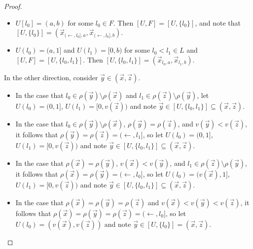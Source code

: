 \documentclass[11pt]{article}
\newcommand{\vect}{\vec}
\begin{document}
\begin{proof}
    \begin{itemize}
      \item
        \(U[l_0]=(a,b)\) for some \(l_0\in F\).
        Then \([U,F]=[U,\{l_0\}]\), and note that
        \(
          [U,\{l_0\}]
            =
          (\vect x_{(\leftarrow,l_0],a},\vect x_{(\leftarrow,l_0],b})
        \).
      \item
        \(U(l_0)=(a,1]\) and \(U(l_1)=[0,b)\) for some \(l_0<l_1\in L\)
        and \([U,F]=[U,\{l_0,l_1\}]\). Then
        \([U,\{l_0,l_1\}]=(\vect x_{l_0,a},\vect x_{l_1,b})\).
    \end{itemize}
    In the other direction, consider \(\vect y\in(\vect x,\vect z)\).
    \begin{itemize}
      \item
        In the case that \(l_0\in\rho(\vect y)\setminus\rho(\vect x)\)
        and \(l_1\in\rho(\vect z)\setminus\rho(\vect y)\), let
        \(U(l_0)=(0,1]\), \(U(l_1)=[0,v(\vect z))\) and note
        \(\vect y\in[U,\{l_0,l_1\}]\subseteq(\vect x,\vect z)\).
      \item
        In the case that \(l_0\in\rho(\vect y)\setminus\rho(\vect x)\),
        \(\rho(\vect y)=\rho(\vect z)\), and \(v(\vect y)<v(\vect z)\),
        it follows that \(\rho(\vect y)=\rho(\vect z)=(\leftarrow,l_1]\),
        so let \(U(l_0)=(0,1]\), \(U(l_1)=[0,v(\vect z))\) and note
        \(\vect y\in[U,\{l_0,l_1\}]\subseteq(\vect x,\vect z)\).
      \item
        In the case that
        \(\rho(\vect x)=\rho(\vect y)\), \(v(\vect x)<v(\vect y)\),
        and \(l_1\in\rho(\vect z)\setminus\rho(\vect y)\),
        it follows that \(\rho(\vect x)=\rho(\vect y)=(\leftarrow,l_0]\),
        so let \(U(l_0)=(v(\vect x),1]\), \(U(l_1)=[0,v(\vect z))\) and note
        \(\vect y\in[U,\{l_0,l_1\}]\subseteq(\vect x,\vect z)\).
      \item
        In the case that
        \(\rho(\vect x)=\rho(\vect y)=\rho(\vect z)\) and
        \(v(\vect x)<v(\vect y)<v(\vect z)\),
        it follows that
        \(\rho(\vect x)=\rho(\vect y)=\rho(\vect z)=(\leftarrow,l_0]\),
        so let \(U(l_0)=(v(\vect x),v(\vect z))\) and note
        \(\vect y\in[U,\{l_0\}]=(\vect x,\vect z)\).
    \end{itemize}


\end{proof}
\end{document}

